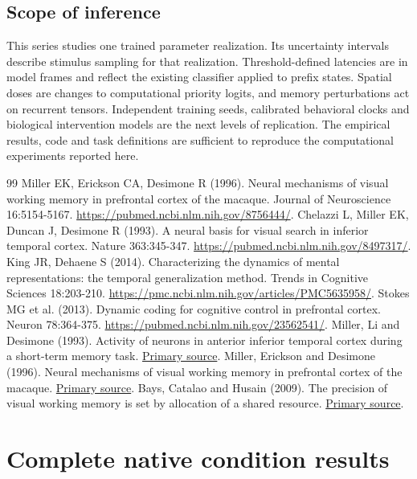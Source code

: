 \documentclass[11pt]{article}
\begin{document}
\subsection{Scope of inference}
This series studies one trained parameter realization. Its uncertainty intervals describe stimulus sampling for that realization. Threshold-defined latencies are in model frames and reflect the existing classifier applied to prefix states. Spatial doses are changes to computational priority logits, and memory perturbations act on recurrent tensors. Independent training seeds, calibrated behavioral clocks and biological intervention models are the next levels of replication. The empirical results, code and task definitions are sufficient to reproduce the computational experiments reported here.

\begin{thebibliography}{99}
 Miller EK, Erickson CA, Desimone R (1996). Neural mechanisms of visual working memory in prefrontal cortex of the macaque. Journal of Neuroscience 16:5154-5167. \url{https://pubmed.ncbi.nlm.nih.gov/8756444/}.
 Chelazzi L, Miller EK, Duncan J, Desimone R (1993). A neural basis for visual search in inferior temporal cortex. Nature 363:345-347. \url{https://pubmed.ncbi.nlm.nih.gov/8497317/}.
 King JR, Dehaene S (2014). Characterizing the dynamics of mental representations: the temporal generalization method. Trends in Cognitive Sciences 18:203-210. \url{https://pmc.ncbi.nlm.nih.gov/articles/PMC5635958/}.
 Stokes MG et al. (2013). Dynamic coding for cognitive control in prefrontal cortex. Neuron 78:364-375. \url{https://pubmed.ncbi.nlm.nih.gov/23562541/}.
 Miller, Li and Desimone (1993). Activity of neurons in anterior inferior temporal cortex during a short-term memory task. \href{https://pubmed.ncbi.nlm.nih.gov/8463829/}{Primary source}.
 Miller, Erickson and Desimone (1996). Neural mechanisms of visual working memory in prefrontal cortex of the macaque. \href{https://pmc.ncbi.nlm.nih.gov/articles/PMC6579322/}{Primary source}.
 Bays, Catalao and Husain (2009). The precision of visual working memory is set by allocation of a shared resource. \href{https://pubmed.ncbi.nlm.nih.gov/19810788/}{Primary source}.
\end{thebibliography}\clearpage\appendix\section{Complete native condition results}
\end{document}
